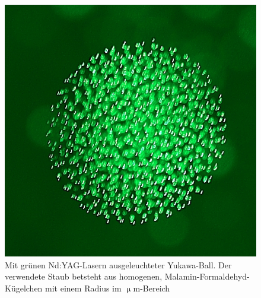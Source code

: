   \begin{figure}[!h]
  \centering
    \begin{minipage}{0.49\textwidth}
      \centering
      \includegraphics[scale=1.]{figs/cluster.png}
    \end{minipage}
    \begin{minipage}{0.48\textwidth}
      \caption{Mit grünen Nd:YAG-Lasern ausgeleuchteter Yukawa-Ball. Der verwendete Staub  betsteht aus homogenen, Malamin-Formaldehyd-Kügelchen mit einem Radius im $\upmu$m-Bereich}
    \end{minipage}
  \end{figure}
